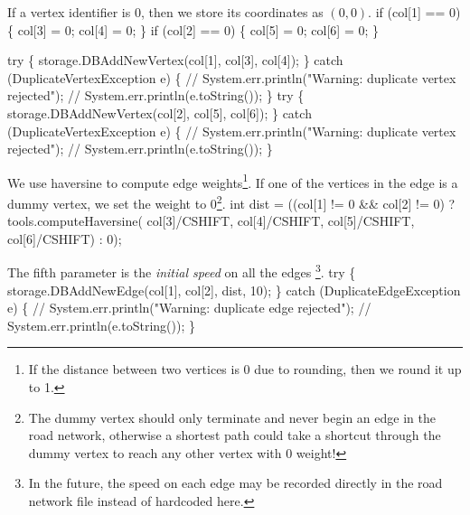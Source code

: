 \documentclass{article}
\def\nwendcode{\endtrivlist \endgroup}      %
\let\nwdocspar=\par
\begin{document}
If a vertex identifier is $0$, then we store its coordinates as $(0,0)$.
\nwenddocs{}\endmoddef{}
if (col[1] == 0) \{
  col[3] = 0;
  col[4] = 0;
\}
if (col[2] == 0) \{
  col[5] = 0;
  col[6] = 0;
\}
\nwendcode{}\nwdocspar
\nwenddocs{}\endmoddef{}
try \{
  storage.DBAddNewVertex(col[1], col[3], col[4]);
\} catch (DuplicateVertexException e) \{
  // System.err.println("Warning: duplicate vertex rejected");
  // System.err.println(e.toString());
\}
try \{
  storage.DBAddNewVertex(col[2], col[5], col[6]);
\} catch (DuplicateVertexException e) \{
  // System.err.println("Warning: duplicate vertex rejected");
  // System.err.println(e.toString());
\}
\nwendcode{}\nwdocspar
We use haversine to compute edge weights\footnote{If the distance between two
vertices is 0 due to rounding, then we round it up to 1.}.  If one of the
vertices in the edge is a dummy vertex, we set the weight to 0\footnote{The
dummy vertex should only terminate and never begin an edge in the road network,
otherwise a shortest path could take a shortcut through the dummy vertex to
reach any other vertex with 0 weight!}.
\nwenddocs{}\endmoddef{}
int dist = ((col[1] != 0 && col[2] != 0)
  ? tools.computeHaversine(
        col[3]/CSHIFT, col[4]/CSHIFT,
        col[5]/CSHIFT, col[6]/CSHIFT) : 0);
\nwendcode{}\nwdocspar
The fifth parameter is the \textit{initial speed} on all the edges \footnote{In
the future, the speed on each edge may be recorded directly in the road network
file instead of hardcoded here.}.
\nwenddocs{}\endmoddef{}
try \{
  storage.DBAddNewEdge(col[1], col[2], dist, 10);
\} catch (DuplicateEdgeException e) \{
  // System.err.println("Warning: duplicate edge rejected");
  // System.err.println(e.toString());
\}
\nwendcode{}\nwdocspar
\end{document}
